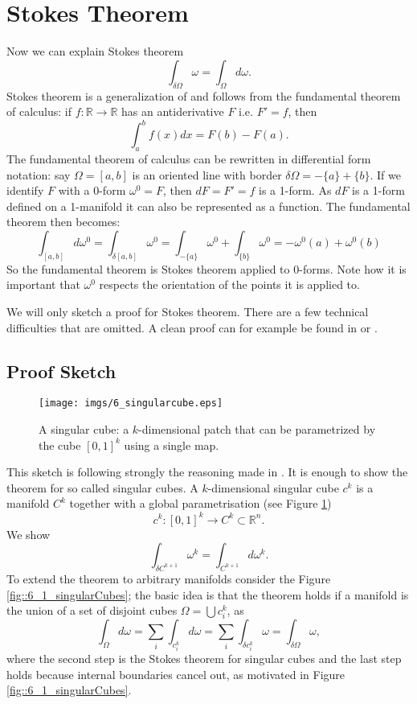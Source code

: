 \section{Stokes Theorem}
\label{sec:EC_stokes}

Now we can explain Stokes theorem
\[\int_{\delta\Omega} \omega = \int_{\Omega} d \omega.\]
Stokes theorem is a generalization of and follows from the fundamental theorem of calculus: if $f:\mathbb R \to \mathbb R $ has an antiderivative $F$ i.e. $F' = f$, then
\[\int_a^b f(x) dx = F(b) - F(a).\]
The fundamental theorem of calculus can be rewritten in differential form notation: say $\Omega = [a,b]$ is an oriented line with border $\delta \Omega = -\{a\} + \{b\}$. If we identify $F$ with a 0-form $\omega^0 = F$, then $d F = F' =f$ is a 1-form. As $dF$ is a 1-form defined on a 1-manifold it can also be represented as a function. The fundamental theorem then becomes:
\[\int_{[a,b]} d\omega^0 = \int_{\delta [a,b]} \omega^0 = \int_{-\{a\}}\omega^0 + \int_{\{b\}} \omega^0 = -\omega^0(a) + \omega^0(b)\]
So the fundamental theorem is Stokes theorem applied to $0$-forms. Note how it is important that $\omega^0$ respects the orientation of the points it is applied to.

We will only sketch a proof for Stokes theorem. 
There are a few technical difficulties that are omitted. A clean proof can for example be found in \cite{globalAnalysis} or \cite{FRANKEL11}.

\subsection{Proof Sketch}

\begin{figure}%
\begin{center}
\texttt{[image: imgs/6\_singularcube.eps]}%
\end{center}
\vspace{-0.5cm}
\caption{A singular cube: a $k$-dimensional patch that can be parametrized by the cube $[0,1]^k$ using a single map.}%
\label{fig:6_singularCube}%
\end{figure}
This sketch is following strongly the reasoning made in \cite{globalAnalysis}.
It is enough to show the theorem for so called singular cubes. A $k$-dimensional singular cube $c^k$ is a manifold $C^k$ together with a global parametrisation (see Figure \ref{fig:6_singularCube})
\[c^k: [0,1]^k \to C^k \subset \mathbb R^n.\] 
We show
\[\int_{\delta C^{k+1}} \omega^{k} = \int_{C^{k+1}}d\omega^k.\] 
To extend the theorem to arbitrary manifolds consider the Figure \ref{fig::6_1_singularCubes}; the basic idea is that the theorem holds if a manifold is the union of a set of disjoint cubes $\Omega = \bigcup c^k_i$, as
\[\int_{\Omega} d\omega = \sum_i \int_{c^k_i} d\omega = \sum_i \int_{\delta c^k_i} \omega = \int_{\delta \Omega} \omega ,\]
where the second step is the Stokes theorem for singular cubes and the last step holds because internal boundaries cancel out, as motivated in Figure \ref{fig::6_1_singularCubes}.

